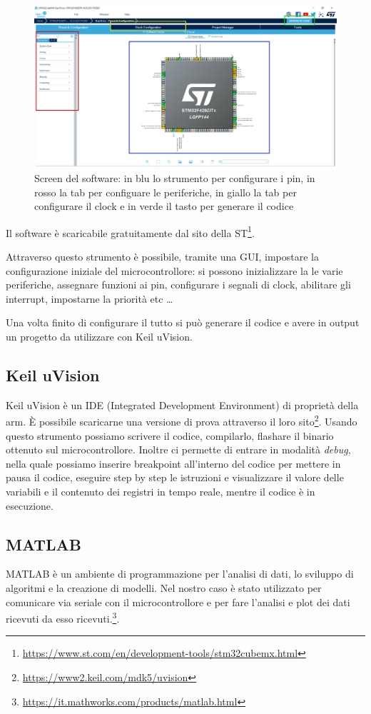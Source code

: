 \begin{figure}[htb]
\centering
\includegraphics[width=\textwidth]{assets/introduzione/cube_mx_highlight.png}
\caption{Screen del software: in blu lo strumento per configurare i pin, in rosso la tab per configuare le periferiche, in giallo la tab per configurare il clock e in verde il tasto per generare il codice}
\end{figure}

Il software è scaricabile gratuitamente dal sito della ST\footnote{\href{https://www.st.com/en/development-tools/stm32cubemx.html}{https://www.st.com/en/development-tools/stm32cubemx.html}}.


Attraverso questo strumento è possibile, tramite una GUI, impostare la configurazione iniziale del microcontrollore: si possono inizializzare la le varie periferiche, assegnare funzioni ai pin, configurare i segnali di clock, abilitare gli interrupt, impostarne la priorità etc \dots

Una volta finito di configurare il tutto si può generare il codice e avere in output un progetto da utilizzare con Keil uVision.

\subsection*{Keil uVision}
Keil uVision è un IDE (Integrated Development Environment) di proprietà della arm. È possibile scaricarne una versione di prova attraverso il loro sito\footnote{\href{https://www2.keil.com/mdk5/uvision}{https://www2.keil.com/mdk5/uvision}}.
Usando questo strumento possiamo scrivere il codice, compilarlo, flashare il binario ottenuto sul microcontrollore. Inoltre ci permette di entrare in modalità \textit{debug}, nella quale possiamo inserire breakpoint all'interno del codice per mettere in pausa il codice, eseguire step by step le istruzioni e visualizzare il valore delle variabili e il contenuto dei registri in tempo reale, mentre il codice è in esecuzione.

\subsection*{MATLAB}
MATLAB è un ambiente di programmazione per l’analisi di dati, lo sviluppo di algoritmi e la creazione di modelli. 
Nel nostro caso è stato utilizzato per comunicare via seriale con il microcontrollore e per fare l'analisi e plot dei dati ricevuti da esso ricevuti.\footnote{\href{https://it.mathworks.com/products/matlab.html}{https://it.mathworks.com/products/matlab.html}}.